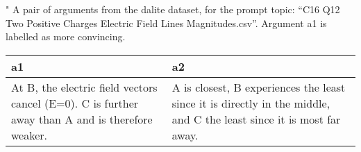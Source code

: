 \centering
\caption{"
              A pair of arguments from the dalite dataset, 
              for the prompt topic: ``C16 Q12 Two Positive Charges Electric Field Lines Magnitudes.csv''. 
              Argument a1 is labelled as more convincing.
              }
\begin{tabular}{p{6cm}|p{6cm}}
\toprule
                                                                                               a1 &                                                                                                                    a2 \\
\midrule
 At B, the electric field vectors cancel (E=0). C is further away than A and is therefore weaker. &  A is closest, B experiences the least since it is directly in the middle, and C the least since it is most far away. \\
\bottomrule
\end{tabular}
